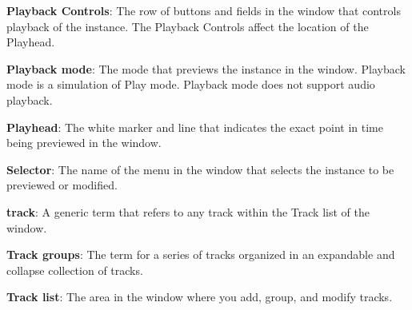 {\bfseries{ Playback Controls}}\+: The row of buttons and fields in the  window that controls playback of the  instance. The  Playback Controls affect the location of the  Playhead.

{\bfseries{ Playback mode}}\+: The mode that previews the  instance in the  window.  Playback mode is a simulation of Play mode.  Playback mode does not support audio playback.

{\bfseries{ Playhead}}\+: The white marker and line that indicates the exact point in time being previewed in the  window.

{\bfseries{ Selector}}\+: The name of the menu in the  window that selects the  instance to be previewed or modified.

{\bfseries{track}}\+: A generic term that refers to any track within the Track list of the  window.

{\bfseries{Track groups}}\+: The term for a series of tracks organized in an expandable and collapse collection of tracks.

{\bfseries{Track list}}\+: The area in the  window where you add, group, and modify tracks. 